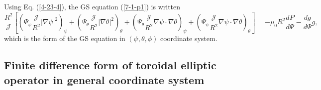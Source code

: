 \documentclass{article}
\begin{document}
Using Eq. (\ref{4-23-4}), the GS equation (\ref{7-1-p1}) is written
\begin{equation}
  \label{4-25-7} \frac{R^2}{\mathcal{J}} \left[ \left( \Psi_{\psi}
  \frac{\mathcal{J}}{R^2} | \nabla \psi |^2 \right)_{\psi} + \left(
  \Psi_{\theta} \frac{\mathcal{J}}{R^2} | \nabla \theta |^2 \right)_{\theta} +
  \left( \Psi_{\theta} \frac{\mathcal{J}}{R^2} \nabla \psi \cdot \nabla \theta
  \right)_{\psi} + \left( \Psi_{\psi} \frac{\mathcal{J}}{R^2} \nabla \psi
  \cdot \nabla \theta \right)_{\theta} \right] = - \mu_0 R^2 \frac{d P}{d
  \Psi} - \frac{d g}{d \Psi} g,
\end{equation}
which is the form of the GS equation in $(\psi, \theta, \phi)$ coordinate
system.

\subsection{Finite difference form of toroidal elliptic operator in general
coordinate system}
\end{document}
